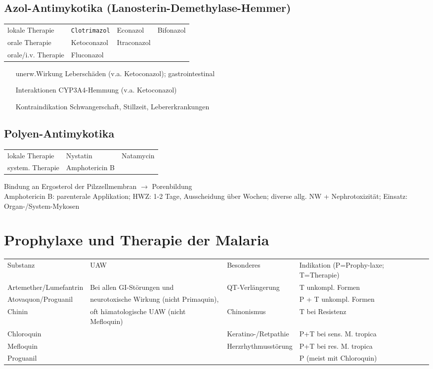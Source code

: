 \documentclass[10pt,a4paper]{report}
\begin{document}
\subsection{Azol-Antimykotika (Lanosterin-Demethylase-Hemmer)} %
\label{sub:azol_antimykotika_lanosterin_demethylase_hemmer_}
\begin{tabularx}{\textwidth}{lXXX}
lokale Therapie&\texttt{Clotrimazol}&Econazol&Bifonazol\\
orale Therapie&Ketoconazol&Itraconazol\\ 
orale/i.v. Therapie&Fluconazol\\
\end{tabularx}
\begin{itemize}
	\item[unerw.Wirkung]  Leberschäden (v.a. Ketoconazol); gastrointestinal
	\item[Interaktionen] CYP3A4-Hemmung (v.a. Ketoconazol)
	\item[Kontraindikation] Schwangerschaft, Stillzeit, Lebererkrankungen
\end{itemize}
\subsection{Polyen-Antimykotika} %
\label{sub:polyen_antimykotika}
\begin{tabularx}{\textwidth}{lXX}
lokale Therapie&Nystatin&Natamycin\\  
system. Therapie&Amphotericin B\\ 
\end{tabularx}
Bindung an Ergosterol der Pilzzellmembran $\rightarrow$ Porenbildung\\
Amphotericin B: parenterale Applikation; HWZ: 1-2 Tage, Ausscheidung über Wochen; diverse allg. NW + Nephrotoxizität; Einsatz: Organ-/System-Mykosen 
\section{Prophylaxe und Therapie der Malaria} %
\label{sec:prophylaxe_und_therapie_der_malaria}
\begin{tabularx}{\textwidth}{XXXX}
Substanz&UAW&Besonderes&Indikation (P=Prophy-laxe; T=Therapie)\\
Artemether/Lumefantrin&Bei allen GI-Störungen und  &QT-Verlängerung&T unkompl. Formen\\
Atovaquon/Proguanil&neurotoxische Wirkung (nicht Primaquin),&&P + T unkompl. Formen\\
Chinin&oft hämatologische UAW (nicht Mefloquin)&Chinonismus&T bei Resistenz\\
Chloroquin&&Keratino-/Retpathie&P+T bei sens. M. tropica\\
Mefloquin&&Herzrhythmusstörung&P+T bei res. M. tropica\\
Proguanil&&&P (meist mit Chloroquin)\\
\end{tabularx}
\end{document}
